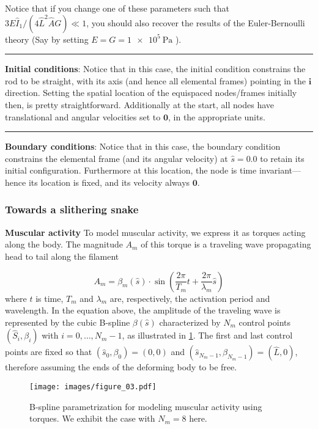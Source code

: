 \documentclass[11pt]{article}
\begin{document}
Notice that if you change one of these parameters such that \(3E\hat{I}_1/(4\hat{L}^2\hat{A}G)\ll 1\), you should also recover the
results of the Euler-Bernoulli theory (Say by setting \(E = G = \SI{1e5}{\Pa}\) ).

\noindent\rule{1\textwidth}{0.01pt}
\textbf{Initial conditions}: Notice that in this case, the initial
condition constrains the rod to be straight, with its axis (and hence all
elemental frames) pointing in the \(\mathbf{i}\) direction. Setting the spatial location
of the equispaced nodes/frames initially then, is pretty straightforward. Additionally at the
start, all nodes have translational and angular velocities set to \(\mathbf{0}\), in the
appropriate units.

\noindent\rule{1\textwidth}{0.01pt}
\textbf{Boundary conditions}: Notice that in this case, the boundary
condition constrains the elemental frame (and its angular velocity) at \(\hat{s} = 0.0\) to retain its initial configuration. Furthermore at this
location, the node is time invariant---hence its location is fixed, and its
velocity always \(\mathbf{0}\).
\subsubsection{Towards a slithering snake}
\label{sec:org2adc4ab}
\textbf{Muscular activity} To model muscular activity, we express it as torques
 acting along the body. The magnitude \(A_m\) of this torque is a traveling
 wave propagating head to tail along the filament

\[ A_m=\beta_m(\hat{s})\cdot\sin\left(\frac{2\pi}{T_m} t +
											\frac{2\pi}{\lambda_m}
											\hat{s}\right) \]
where \(t\) is time, \(T_m\) and \(\lambda_m\) are,
respectively, the activation period and wavelength. In the equation above,
the amplitude of the traveling wave is represented by the cubic B-spline \(\beta(\hat{s})\) characterized by \(N_m\) control points \((\hat{S}_i,\beta_i)\) with \(i=0,\dots,N_m-1\), as illustrated in
\cref{fig_spline}. The first and last control points are fixed so that \((\hat{s}_0,\beta_0)=(0,0)\)
and \((\hat{s}_{N_m-1},\beta_{N_m-1})=(\hat{L},0)\), therefore assuming the
ends of the deforming body to be free.

\begin{figure}[htbp]
\centering
\texttt{[image: images/figure\_03.pdf]}
\caption{\label{fig_spline}
B-spline parametrization for modeling muscular activity using torques. We exhibit the case with \(N_m = 8\) here.}
\end{figure}
\end{document}
